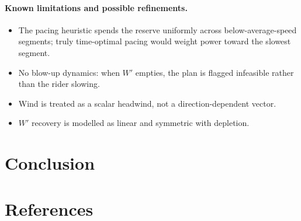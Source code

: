\documentclass[11pt]{article}
\begin{document}
\paragraph{Known limitations and possible refinements.}
\begin{itemize}
  \item The pacing heuristic spends the reserve uniformly across below-average-speed segments; truly time-optimal pacing would weight power toward the slowest segment.
  \item No blow-up dynamics: when $W'$ empties, the plan is flagged infeasible rather than the rider slowing.
  \item Wind is treated as a scalar headwind, not a direction-dependent vector.
  \item $W'$ recovery is modelled as linear and symmetric with depletion.
\end{itemize}

\section{Conclusion}

\section*{References}
\end{document}
